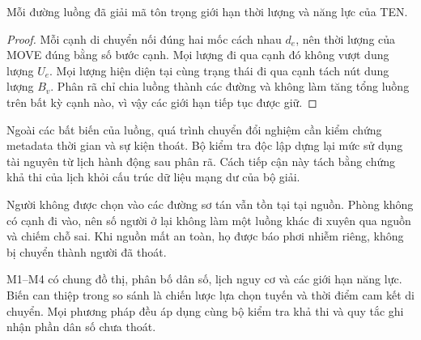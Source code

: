 \begin{dinhly}Mỗi đường luồng đã giải mã tôn trọng giới hạn thời lượng và năng lực của TEN.\end{dinhly}
\begin{proof}
Mỗi cạnh di chuyển nối đúng hai mốc cách nhau $d_e$, nên thời lượng của MOVE đúng bằng số bước cạnh. Mọi lượng đi qua cạnh đó không vượt dung lượng $U_e$. Mọi lượng hiện diện tại cùng trạng thái đi qua cạnh tách nút dung lượng $B_v$. Phân rã chỉ chia luồng thành các đường và không làm tăng tổng luồng trên bất kỳ cạnh nào, vì vậy các giới hạn tiếp tục được giữ.
\end{proof}

Ngoài các bất biến của luồng, quá trình chuyển đổi nghiệm cần kiểm chứng metadata thời gian và sự kiện thoát. Bộ kiểm tra độc lập dựng lại mức sử dụng tài nguyên từ lịch hành động sau phân rã. Cách tiếp cận này tách bằng chứng khả thi của lịch khỏi cấu trúc dữ liệu mạng dư của bộ giải.

Người không được chọn vào các đường sơ tán vẫn tồn tại tại nguồn. Phòng không có cạnh đi vào, nên số người ở lại không làm một luồng khác đi xuyên qua nguồn và chiếm chỗ sai. Khi nguồn mất an toàn, họ được báo phơi nhiễm riêng, không bị chuyển thành người đã thoát.

M1--M4 có chung đồ thị, phân bố dân số, lịch nguy cơ và các giới hạn năng lực. Biến can thiệp trong so sánh là chiến lược lựa chọn tuyến và thời điểm cam kết di chuyển. Mọi phương pháp đều áp dụng cùng bộ kiểm tra khả thi và quy tắc ghi nhận phần dân số chưa thoát.

